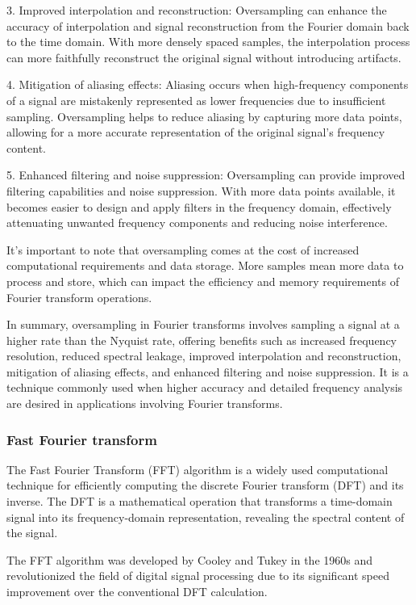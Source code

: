 3. Improved interpolation and reconstruction: Oversampling can enhance the accuracy of interpolation and signal reconstruction from the Fourier domain back to the time domain. With more densely spaced samples, the interpolation process can more faithfully reconstruct the original signal without introducing artifacts.

4. Mitigation of aliasing effects: Aliasing occurs when high-frequency components of a signal are mistakenly represented as lower frequencies due to insufficient sampling. Oversampling helps to reduce aliasing by capturing more data points, allowing for a more accurate representation of the original signal's frequency content.

5. Enhanced filtering and noise suppression: Oversampling can provide improved filtering capabilities and noise suppression. With more data points available, it becomes easier to design and apply filters in the frequency domain, effectively attenuating unwanted frequency components and reducing noise interference.

It's important to note that oversampling comes at the cost of increased computational requirements and data storage. More samples mean more data to process and store, which can impact the efficiency and memory requirements of Fourier transform operations.

In summary, oversampling in Fourier transforms involves sampling a signal at a higher rate than the Nyquist rate, offering benefits such as increased frequency resolution, reduced spectral leakage, improved interpolation and reconstruction, mitigation of aliasing effects, and enhanced filtering and noise suppression. It is a technique commonly used when higher accuracy and detailed frequency analysis are desired in applications involving Fourier transforms.

\subsubsection{Fast Fourier transform}

The Fast Fourier Transform (FFT) algorithm is a widely used computational technique for efficiently computing the discrete Fourier transform (DFT) and its inverse.
The DFT is a mathematical operation that transforms a time-domain signal into its frequency-domain representation, revealing the spectral content of the signal.

The FFT algorithm was developed by Cooley and Tukey in the 1960s and revolutionized the field of digital signal processing due to its significant speed improvement over the conventional DFT calculation.

